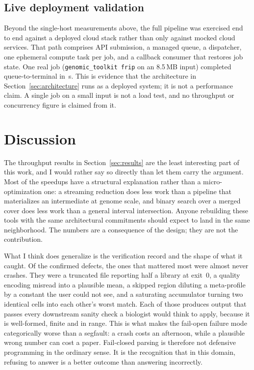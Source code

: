 \documentclass[10pt,twocolumn]{article}
\begin{document}
\subsection{Live deployment validation}

Beyond the single-host measurements above, the full pipeline was exercised
end to end against a deployed cloud stack rather than only against mocked
cloud services. That path comprises API submission, a managed queue, a
dispatcher, one ephemeral compute task per job, and a callback consumer that
restores job state. One real job (\texttt{genomic\_toolkit frip} on an
8.5\,MB input) completed queue-to-terminal in \LiveJobLatency{}\,s. This is
evidence that the architecture in Section~\ref{sec:architecture} runs as a
deployed system; it is not a performance claim. A single job on a small input
is not a load test, and no throughput or concurrency figure is claimed from
it.

\section{Discussion}

The throughput results in Section~\ref{sec:results} are the least
interesting part of this work, and I would rather say so directly than let
them carry the argument. Most of the speedups have a structural explanation
rather than a micro-optimization one: a streaming reduction does less work
than a pipeline that materializes an intermediate at genome scale, and
binary search over a merged cover does less work than a general interval
intersection. Anyone rebuilding these tools with the same architectural
commitments should expect to land in the same neighborhood. The numbers are a
consequence of the design; they are not the contribution.

What I think does generalize is the verification record and the shape of what
it caught. Of the \NumAuditTotal{} confirmed defects, the ones that mattered
most were almost never crashes. They were a truncated file reporting half a
library at exit~0, a quality encoding misread into a plausible mean, a
skipped region diluting a meta-profile by a constant the user could not see,
and a saturating accumulator turning two identical cells into each other's
worst match. Each of those produces output that passes every downstream
sanity check a biologist would think to apply, because it is well-formed,
finite and in range. This is what makes the fail-open failure mode
categorically worse than a segfault: a crash costs an afternoon, while a
plausible wrong number can cost a paper. Fail-closed parsing is therefore not
defensive programming in the ordinary sense. It is the recognition that in
this domain, refusing to answer is a better outcome than answering
incorrectly.
\end{document}
